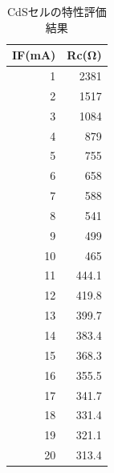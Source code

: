\documentclass[titlepage]{jarticle}
\begin{document}
\begin{table}[htbp]
    \begin{center}
        \caption{CdSセルの特性評価結果}
        \begin{tabular}{r|r}
            \hline\hline
            \multicolumn{1}{l|}{IF(mA)} & \multicolumn{1}{l}{Rc(Ω)} \\ \hline
            1                           & 2381                      \\ \hline
            2                           & 1517                      \\ \hline
            3                           & 1084                      \\ \hline
            4                           & 879                       \\ \hline
            5                           & 755                       \\ \hline
            6                           & 658                       \\ \hline
            7                           & 588                       \\ \hline
            8                           & 541                       \\ \hline
            9                           & 499                       \\ \hline
            10                          & 465                       \\ \hline
            11                          & 444.1                     \\ \hline
            12                          & 419.8                     \\ \hline
            13                          & 399.7                     \\ \hline
            14                          & 383.4                     \\ \hline
            15                          & 368.3                     \\ \hline
            16                          & 355.5                     \\ \hline
            17                          & 341.7                     \\ \hline
            18                          & 331.4                     \\ \hline
            19                          & 321.1                     \\ \hline
            20                          & 313.4                     \\ \hline
        \end{tabular}
        \label{CdSセルの特性評価結果}
    \end{center}
\end{table}
\end{document}
